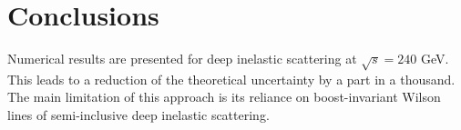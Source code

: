 \section{Conclusions}\label{sec:conclusions}

Numerical results are presented for deep inelastic scattering at
$\sqrt{s} = 240$ GeV. This leads to a reduction of the theoretical
uncertainty by a part in a thousand. The main limitation of this
approach is its reliance on boost-invariant Wilson lines of
semi-inclusive deep inelastic scattering.

